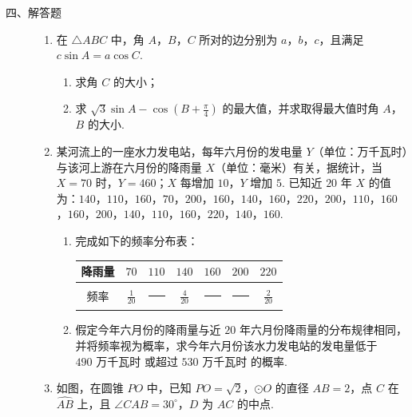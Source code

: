 \begin{description}

    \item[四、解答题]

    \begin{enumerate}[leftmargin=5pt]

      \addtocounter{enumi}{+16}

        \item 在 \(\triangle ABC\) 中，角 \(A\)，\(B\)，\(C\) 所对的边分别为 \(a\)，\(b\)，\(c\)，且满足 \(c \sin A = a \cos C\).
\begin{enumerate}
\item 求角 \(C\) 的大小；
\item 求 \( \sqrt{3}\sin A - \cos\left(B + \frac{\pi}{4}\right) \) 的最大值，并求取得最大值时角 \(A\)，\(B\) 的大小.
\end{enumerate}

        \item 某河流上的一座水力发电站，每年六月份的发电量 \(Y\)（单位：\(\text{万千瓦时}\)）与该河上游在六月份的降雨量 \(X\)（单位：\(\text{毫米}\)）有关，据统计，当 \(X = 70\) 时，\(Y = 460\)；\(X\) 每增加 \(10\)，\(Y\) 增加 \(5\). 已知近 \(20\) 年 \(X\) 的值为：\(140\)，\(110\)，\(160\)，\(70\)，\(200\)，\(160\)，\(140\)，\(160\)，\(220\)，\(200\)，\(110\)，\(160\)，\(160\)，\(200\)，\(140\)，\(110\)，\(160\)，\(220\)，\(140\)，\(160\).

\begin{enumerate}
\item 完成如下的频率分布表：

\begin{center}
\begin{tabular}{c|cccccc}
降雨量 & \(70\) & \(110\) & \(140\) & \(160\) & \(200\) & \(220\) \\
\hline
频率 & \(\frac{1}{20}\) &\rule[-0.3ex]{3em}{0.4pt} & \(\frac{4}{20}\) &\rule[-0.3ex]{3em}{0.4pt} &\rule[-0.3ex]{3em}{0.4pt} & \(\frac{2}{20}\)
\end{tabular}
\end{center}

\item 假定今年六月份的降雨量与近 \(20\) 年六月份降雨量的分布规律相同，并将频率视为概率，求今年六月份该水力发电站的发电量低于 \(490\text{ 万千瓦时}\) 或超过 \(530\text{ 万千瓦时}\) 的概率.
\end{enumerate}

        \item 如图，在圆锥 \(PO\) 中，已知 \(PO = \sqrt{2}\)，\(\odot O\) 的直径 \(AB = 2\)，点 \(C\) 在 \(\widehat{AB}\) 上，且 \(\angle CAB = 30^{\circ}\)，\(D\) 为 \(AC\) 的中点.


\end{enumerate}
\end{description}
